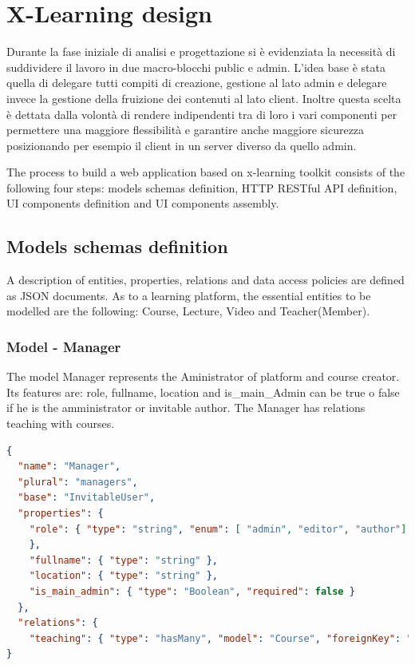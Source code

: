 \section{X-Learning design}
\label{sec:x-learning_design}

Durante la fase iniziale di analisi e progettazione si è evidenziata la necessità di suddividere il lavoro in due macro-blocchi public e admin. L’idea base è stata quella di delegare tutti compiti di creazione, gestione al lato admin e delegare invece la gestione della fruizione dei contenuti al lato client.
Inoltre questa scelta è dettata dalla volontà di rendere indipendenti tra di loro i vari componenti per permettere una maggiore flessibilità e garantire anche maggiore sicurezza posizionando per esempio il client in un server diverso da quello admin.


The process to build a web application based on x-learning toolkit consists of the following four steps: models schemas definition, HTTP RESTful API definition, UI components definition and UI components  assembly.


\subsection {Models schemas definition}
\label{subsec:models_schemas_definitio}


A description of entities, properties, relations and data access policies are defined as JSON  documents.
As to a learning platform, the essential entities to be modelled are the following: Course, Lecture, Video and Teacher(Member).


\subsubsection{ Model - Manager}

The model Manager represents the Aministrator of platform and course creator. Its features are: role, fullname, location and is_main_Admin can be true o false if he is the amministrator or invitable author. The Manager has relations teaching with courses.

\begin{lstlisting}[language=json]
{
  "name": "Manager",
  "plural": "managers",
  "base": "InvitableUser",
  "properties": {
    "role": { "type": "string", "enum": [ "admin", "editor", "author"]
    },
    "fullname": { "type": "string" },
    "location": { "type": "string" },
    "is_main_admin": { "type": "Boolean", "required": false }
  },
  "relations": {
    "teaching": { "type": "hasMany", "model": "Course", "foreignKey": "teacher_id" }
}
\end{lstlisting}


